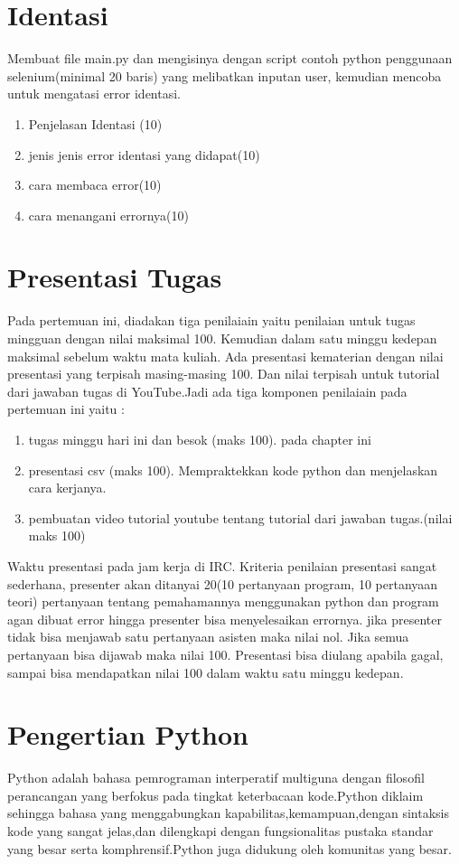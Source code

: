 \section{Identasi}
Membuat file main.py dan mengisinya dengan script contoh python penggunaan selenium(minimal 20 baris) yang melibatkan inputan user, kemudian mencoba untuk mengatasi error identasi.
\begin{enumerate}
	\item
Penjelasan Identasi (10)
	\item
jenis jenis error identasi yang didapat(10)
\item
cara membaca error(10)
\item 
cara menangani errornya(10)
\end{enumerate}

\section{Presentasi Tugas}
Pada pertemuan ini, diadakan tiga penilaiain yaitu penilaian untuk tugas mingguan dengan nilai maksimal 100. Kemudian dalam satu minggu kedepan maksimal sebelum waktu mata kuliah. Ada presentasi kematerian dengan nilai presentasi yang terpisah masing-masing 100. Dan nilai terpisah untuk tutorial dari jawaban tugas di YouTube.Jadi ada tiga komponen penilaiain pada pertemuan ini yaitu :
\begin{enumerate}
	\item tugas minggu hari ini dan besok (maks 100). pada chapter ini
	\item presentasi csv (maks 100). Mempraktekkan kode python dan menjelaskan cara kerjanya.
	\item pembuatan video tutorial youtube tentang tutorial dari jawaban tugas.(nilai maks 100)
\end{enumerate}
Waktu presentasi pada jam kerja di IRC. Kriteria penilaian presentasi sangat sederhana, presenter akan ditanyai 20(10 pertanyaan program, 10 pertanyaan teori) pertanyaan tentang pemahamannya menggunakan python dan program agan dibuat error hingga presenter bisa menyelesaikan errornya. jika presenter tidak bisa menjawab satu pertanyaan asisten maka nilai nol. Jika semua pertanyaan bisa dijawab maka nilai 100. Presentasi bisa diulang apabila gagal, sampai bisa mendapatkan nilai 100 dalam waktu satu minggu kedepan.
\section{Pengertian Python}
    Python adalah bahasa pemrograman interperatif multiguna dengan filosofil perancangan yang berfokus pada tingkat keterbacaan kode.Python diklaim sehingga bahasa yang menggabungkan kapabilitas,kemampuan,dengan sintaksis kode yang sangat jelas,dan dilengkapi dengan fungsionalitas pustaka standar yang besar serta komphrensif.Python juga didukung oleh komunitas yang besar.

